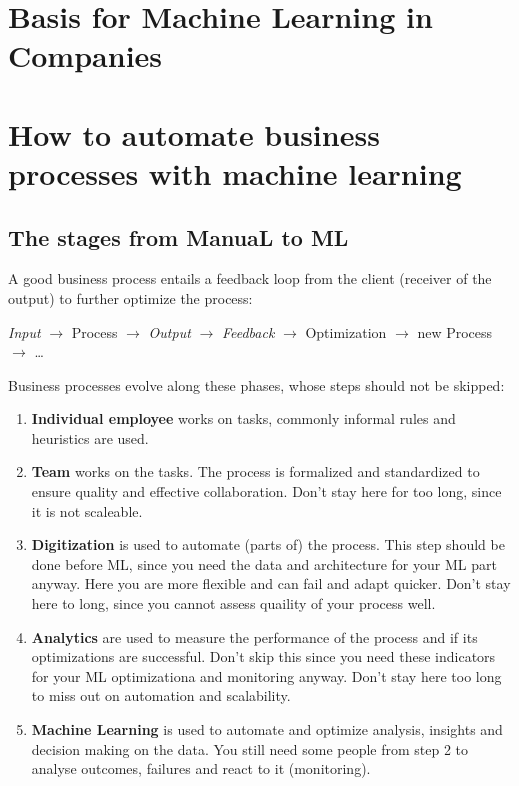 \documentclass[
]{book}
\begin{document}
\hypertarget{basis-for-machine-learning-in-companies}{%
\section{Basis for Machine Learning in Companies}\label{basis-for-machine-learning-in-companies}}

\hypertarget{how-to-automate-business-processes-with-machine-learning}{%
\section{How to automate business processes with machine learning}\label{how-to-automate-business-processes-with-machine-learning}}

\hypertarget{the-stages-from-manual-to-ml}{%
\subsection{The stages from ManuaL to ML}\label{the-stages-from-manual-to-ml}}

A good business process entails a feedback loop from the client
(receiver of the output) to further optimize the process:

\emph{Input} \(\rightarrow\) Process \(\rightarrow\) \emph{Output} \(\rightarrow\)
\emph{Feedback} \(\rightarrow\) Optimization \(\rightarrow\) new Process
\(\rightarrow\) \ldots{}

Business processes evolve along these phases, whose steps should not be
skipped:

\begin{enumerate}
\def\labelenumi{\arabic{enumi}.}
\item
  \textbf{Individual employee} works on tasks, commonly informal rules and
  heuristics are used.
\item
  \textbf{Team} works on the tasks. The process is formalized and
  standardized to ensure quality and effective collaboration. Don't
  stay here for too long, since it is not scaleable.
\item
  \textbf{Digitization} is used to automate (parts of) the process. This
  step should be done before ML, since you need the data and
  architecture for your ML part anyway. Here you are more flexible and
  can fail and adapt quicker. Don't stay here to long, since you
  cannot assess quaility of your process well.
\item
  \textbf{Analytics} are used to measure the performance of the process and
  if its optimizations are successful. Don't skip this since you need
  these indicators for your ML optimizationa and monitoring anyway.
  Don't stay here too long to miss out on automation and scalability.
\item
  \textbf{Machine Learning} is used to automate and optimize analysis,
  insights and decision making on the data. You still need some people
  from step 2 to analyse outcomes, failures and react to it
  (monitoring).
\end{enumerate}
\end{document}
